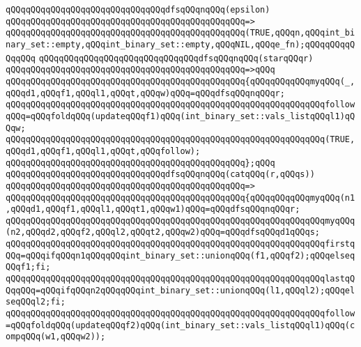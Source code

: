 \newline
\verb|qQQqqQQqqQQqqQQqqQQqqQQqqQQqqQQqdfsqQQqnqQQq(epsilon)|\newline
\verb|qQQqqQQqqQQqqQQqqQQqqQQqqQQqqQQqqQQqqQQqqQQqqQQq=>|\newline
\verb|qQQqqQQqqQQqqQQqqQQqqQQqqQQqqQQqqQQqqQQqqQQqqQQq(TRUE,qQQqn,qQQqint_binary_set::empty,qQQqint_binary_set::empty,qQQqNIL,qQQqe_fn);qQQqqQQqqQQqqQQq|\newline
\newline
\verb|qQQqqQQqqQQqqQQqqQQqqQQqqQQqqQQqdfsqQQqnqQQq(starqQQqr)|\newline
\verb|qQQqqQQqqQQqqQQqqQQqqQQqqQQqqQQqqQQqqQQqqQQqqQQq=>qQQq|\newline
\verb|qQQqqQQqqQQqqQQqqQQqqQQqqQQqqQQqqQQqqQQqqQQqqQQq{qQQqqQQqqQQqmyqQQq(_,qQQqd1,qQQqf1,qQQql1,qQQqt,qQQqw)qQQq=qQQqdfsqQQqnqQQqr;|\newline
\verb|qQQqqQQqqQQqqQQqqQQqqQQqqQQqqQQqqQQqqQQqqQQqqQQqqQQqqQQqqQQqqQQqfollowqQQq=qQQqfoldqQQq(updateqQQqf1)qQQq(int_binary_set::vals_listqQQql1)qQQqw;|\newline
\newline
\verb|qQQqqQQqqQQqqQQqqQQqqQQqqQQqqQQqqQQqqQQqqQQqqQQqqQQqqQQqqQQqqQQq(TRUE,qQQqd1,qQQqf1,qQQql1,qQQqt,qQQqfollow);|\newline
\verb|qQQqqQQqqQQqqQQqqQQqqQQqqQQqqQQqqQQqqQQqqQQqqQQq};qQQq|\newline
\newline
\verb|qQQqqQQqqQQqqQQqqQQqqQQqqQQqqQQqdfsqQQqnqQQq(catqQQq(r,qQQqs))|\newline
\verb|qQQqqQQqqQQqqQQqqQQqqQQqqQQqqQQqqQQqqQQqqQQqqQQq=>|\newline
\verb|qQQqqQQqqQQqqQQqqQQqqQQqqQQqqQQqqQQqqQQqqQQqqQQq{qQQqqQQqqQQqmyqQQq(n1,qQQqd1,qQQqf1,qQQql1,qQQqt1,qQQqw1)qQQq=qQQqdfsqQQqnqQQqr;|\newline
\verb|qQQqqQQqqQQqqQQqqQQqqQQqqQQqqQQqqQQqqQQqqQQqqQQqqQQqqQQqqQQqqQQqmyqQQq(n2,qQQqd2,qQQqf2,qQQql2,qQQqt2,qQQqw2)qQQq=qQQqdfsqQQqd1qQQqs;|\newline
\newline
\verb|qQQqqQQqqQQqqQQqqQQqqQQqqQQqqQQqqQQqqQQqqQQqqQQqqQQqqQQqqQQqqQQqfirstqQQq=qQQqifqQQqn1qQQqqQQqint_binary_set::unionqQQq(f1,qQQqf2);qQQqelseqQQqf1;fi;|\newline
\verb|qQQqqQQqqQQqqQQqqQQqqQQqqQQqqQQqqQQqqQQqqQQqqQQqqQQqqQQqqQQqqQQqlastqQQqqQQq=qQQqifqQQqn2qQQqqQQqint_binary_set::unionqQQq(l1,qQQql2);qQQqelseqQQql2;fi;|\newline
\verb|qQQqqQQqqQQqqQQqqQQqqQQqqQQqqQQqqQQqqQQqqQQqqQQqqQQqqQQqqQQqqQQqfollow=qQQqfoldqQQq(updateqQQqf2)qQQq(int_binary_set::vals_listqQQql1)qQQq(compqQQq(w1,qQQqw2));|\newline
